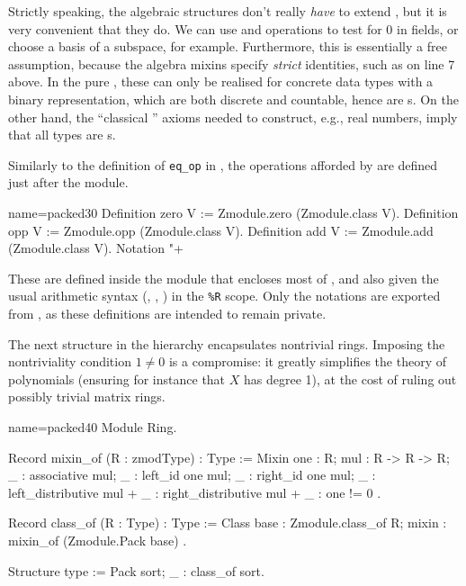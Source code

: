 Strictly speaking, the \mcbMC{} algebraic structures don't really
\emph{have} to extend , but it is very convenient that
they do.  We can use  and  operations to test
for 0 in fields, or choose a basis of a subspace, for example.
Furthermore, this is essentially a free assumption, because the
\mcbMC{} algebra mixins specify \emph{strict} identities, such as
 on line 7 above. In the pure \mcbCIC{}, these can only
be realised for concrete data types with a binary representation,
which are both discrete and countable, hence are s.  On
the other hand, the ``classical \mcbCIC{}'' axioms needed to construct,
e.g., real numbers, imply that all types are s.

Similarly to the definition of \lstinline/eq_op/ in , the
operations afforded by  are defined just after the
 module.

\begin{coq}{name=packed30}{}
Definition zero V := Zmodule.zero (Zmodule.class V).
Definition opp V := Zmodule.opp (Zmodule.class V).
Definition add V := Zmodule.add (Zmodule.class V).
Notation "+%
\end{coq}

These are defined inside the  module that encloses most of
, and also given the usual arithmetic syntax (,
, ) in the \lstinline/%R/
scope. Only the notations are
exported from , as these definitions are intended to remain
private.


The next structure in the hierarchy encapsulates nontrivial rings.
Imposing the nontriviality condition $1 \neq 0$ is a compromise:
it greatly simplifies the theory of polynomials (ensuring for instance that
$X$ has degree 1), at the cost of ruling out possibly trivial matrix rings.

\begin{coq}{name=packed40}{}
Module Ring.

Record mixin_of (R : zmodType) : Type := Mixin {
  one : R;
  mul : R -> R -> R;
  _ : associative mul;
  _ : left_id one mul;
  _ : right_id one mul;
  _ : left_distributive mul +%
  _ : right_distributive mul +%
  _ : one != 0
}.

Record class_of (R : Type) : Type := Class {
  base : Zmodule.class_of R;
  mixin : mixin_of (Zmodule.Pack base)
}.

Structure type := Pack {sort; _ : class_of sort}.
\end{coq}

